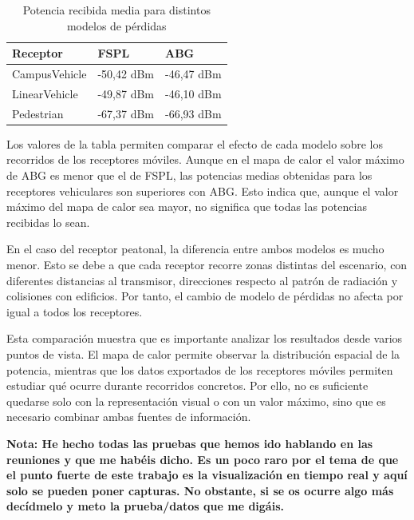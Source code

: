 \begin{table}[H]
    \centering
    \begin{tabularx}{\textwidth}{@{}lXX@{}}
        \toprule
        \textbf{Receptor} & \textbf{FSPL} & \textbf{ABG} \\
        \midrule
        CampusVehicle & -50,42 dBm & -46,47 dBm \\
        LinearVehicle & -49,87 dBm & -46,10 dBm \\
        Pedestrian & -67,37 dBm & -66,93 dBm \\
        \bottomrule
    \end{tabularx}
    \caption{Potencia recibida media para distintos modelos de pérdidas}
    \label{tab:comparativa_modelos_perdidas}
\end{table}

Los valores de la tabla permiten comparar el efecto de cada modelo sobre los recorridos de los receptores móviles. Aunque en el mapa de calor el valor máximo de ABG es menor que el de FSPL, las potencias medias obtenidas para los receptores vehiculares son superiores con ABG. Esto indica que, aunque el valor máximo del mapa de calor sea mayor, no significa que todas las potencias recibidas lo sean.

En el caso del receptor peatonal, la diferencia entre ambos modelos es mucho menor. Esto se debe a que cada receptor recorre zonas distintas del escenario, con diferentes distancias al transmisor, direcciones respecto al patrón de radiación y colisiones con edificios. Por tanto, el cambio de modelo de pérdidas no afecta por igual a todos los receptores.

Esta comparación muestra que es importante analizar los resultados desde varios puntos de vista. El mapa de calor permite observar la distribución espacial de la potencia, mientras que los datos exportados de los receptores móviles permiten estudiar qué ocurre durante recorridos concretos. Por ello, no es suficiente quedarse solo con la representación visual o con un valor máximo, sino que es necesario combinar ambas fuentes de información.

\par\medskip
\textbf{Nota: He hecho todas las pruebas que hemos ido hablando en las reuniones y que me habéis dicho. Es un poco raro por el tema de que el punto fuerte de este trabajo es la visualización en tiempo real y aquí solo se pueden poner capturas. No obstante, si se os ocurre algo más decídmelo y meto la prueba/datos que me digáis.}
\par\medskip


